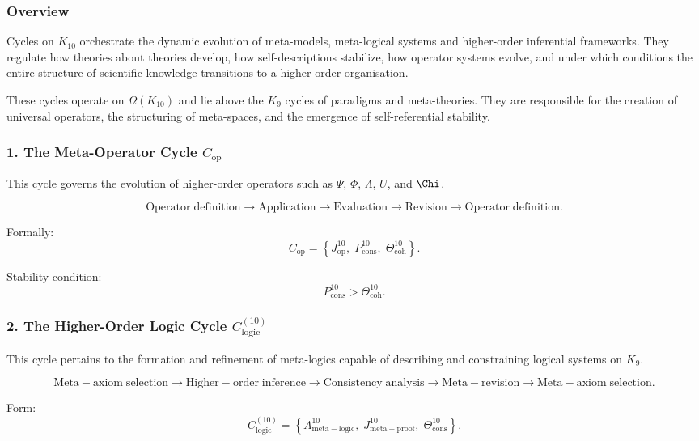 \subsubsection{Overview}

Cycles on $K_{10}$ orchestrate the dynamic evolution of meta-models,
meta-logical systems and higher-order inferential frameworks. They regulate
how theories about theories develop, how self-descriptions stabilize, how
operator systems evolve, and under which conditions the entire structure of
scientific knowledge transitions to a higher-order organisation.

These cycles operate on $\Omega(K_{10})$ and lie above the $K_9$ cycles of
paradigms and meta-theories. They are responsible for the creation of
universal operators, the structuring of meta-spaces, and the emergence of
self-referential stability.


\subsubsection{1. The Meta-Operator Cycle $C_{\mathrm{op}}$}

This cycle governs the evolution of higher-order operators such as
$\Psi$, $\Phi$, $\Lambda$, $U$, and $\Chi$.

\[
  \mathrm{Operator\;definition}
  \to
  \mathrm{Application}
  \to
  \mathrm{Evaluation}
  \to
  \mathrm{Revision}
  \to
  \mathrm{Operator\;definition}.
\]

Formally:
\[
  C_{\mathrm{op}}
  =
  \left\{
    J^{10}_{\mathrm{op}},\;
    P^{10}_{\mathrm{cons}},\;
    \Theta^{10}_{\mathrm{coh}}
  \right\}.
\]

Stability condition:
\[
  P^{10}_{\mathrm{cons}} > \Theta^{10}_\mathrm{coh}.
\]


\subsubsection{2. The Higher-Order Logic Cycle $C_{\mathrm{logic}}^{(10)}$}

This cycle pertains to the formation and refinement of meta-logics capable
of describing and constraining logical systems on $K_9$.

\[
  \mathrm{Meta\!-\!axiom\;selection}
  \to
  \mathrm{Higher\!-\!order\;inference}
  \to
  \mathrm{Consistency\;analysis}
  \to
  \mathrm{Meta\!-\!revision}
  \to
  \mathrm{Meta\!-\!axiom\;selection}.
\]

Form:
\[
  C_{\mathrm{logic}}^{(10)}
   =
   \left\{
     A^{10}_{\mathrm{meta\!-\!logic}},\;
     J^{10}_{\mathrm{meta\!-\!proof}},\;
     \Theta^{10}_{\mathrm{cons}}
   \right\}.
\]

